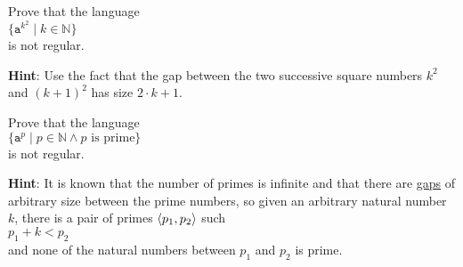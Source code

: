 \exerciseEng
Prove that the language
\\[0.2cm]
\hspace*{1.3cm}
$\{ \mathtt{a}^{k^2} \mid k \in \mathbb{N} \}$
\\[0.2cm]
is not regular.  \eox
\vspace*{0.2cm}

\noindent
\textbf{Hint}: Use the fact that the gap between the two successive square numbers $k^2$ and $(k+1)^2$
has size $2 \cdot k + 1$.


\exerciseEng
Prove that the language
\\[0.2cm]
\hspace*{1.3cm}
$\{ \mathtt{a}^{p} \mid p \in \mathbb{N} \wedge \mbox{$p$ is prime} \}$
\\[0.2cm]
is not regular.  
\vspace*{0.2cm}

\noindent
\textbf{Hint}:  It is known that the number of primes is infinite and that there are
\href{http://en.wikipedia.org/wiki/Prime_gap#Simple_observations}{gaps} of arbitrary size between
the prime numbers, so given an arbitrary natural number 
$k$, there is a pair of primes $\pair(p_1, p_2)$ such
\\[0.2cm]
\hspace*{1.3cm}
$p_1 + k < p_2$ 
\\[0.2cm]
and none of the natural numbers between $p_1$ and $p_2$ is prime.
\eox

